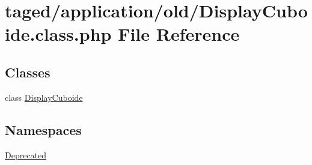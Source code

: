 \hypertarget{_display_cuboide_8class_8php}{}\section{taged/application/old/\+Display\+Cuboide.class.\+php File Reference}
\label{_display_cuboide_8class_8php}
\subsection*{Classes}
\begin{DoxyCompactItemize}
\item 
class \hyperlink{class_display_cuboide}{Display\+Cuboide}
\end{DoxyCompactItemize}
\subsection*{Namespaces}
\begin{DoxyCompactItemize}
\item 
 \hyperlink{namespace_deprecated}{Deprecated}
\end{DoxyCompactItemize}
